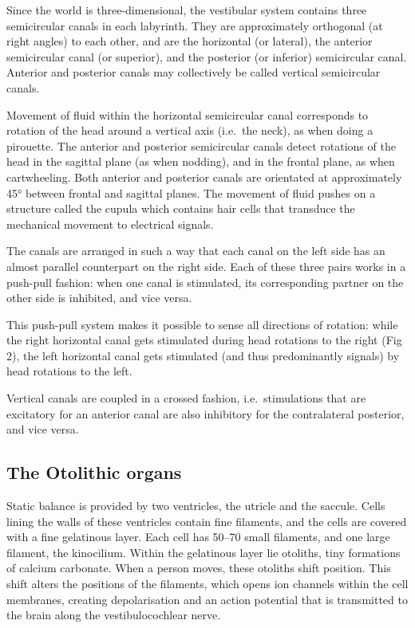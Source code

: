 Since the world is three-dimensional, the vestibular system contains three semicircular canals in each labyrinth. They are approximately orthogonal (at right angles) to each other, and are the horizontal (or lateral), the anterior semicircular canal (or superior), and the posterior (or inferior) semicircular canal. Anterior and posterior canals may collectively be called vertical semicircular canals.

Movement of fluid within the horizontal semicircular canal corresponds to rotation of the head around a vertical axis (i.e.~the neck), as when doing a pirouette.
The anterior and posterior semicircular canals detect rotations of the head in the sagittal plane (as when nodding), and in the frontal plane, as when cartwheeling. Both anterior and posterior canals are orientated at approximately 45° between frontal and sagittal planes.
The movement of fluid pushes on a structure called the cupula which contains hair cells that transduce the mechanical movement to electrical signals.

The canals are arranged in such a way that each canal on the left side has an almost parallel counterpart on the right side. Each of these three pairs works in a push-pull fashion: when one canal is stimulated, its corresponding partner on the other side is inhibited, and vice versa.

This push-pull system makes it possible to sense all directions of rotation: while the right horizontal canal gets stimulated during head rotations to the right (Fig 2), the left horizontal canal gets stimulated (and thus predominantly signals) by head rotations to the left.

Vertical canals are coupled in a crossed fashion, i.e.~stimulations that are excitatory for an anterior canal are also inhibitory for the contralateral posterior, and vice versa.

\hypertarget{the-otolithic-organs}{%
\subsection{The Otolithic organs}\label{the-otolithic-organs}}

Static balance is provided by two ventricles, the utricle and the saccule. Cells lining the walls of these ventricles contain fine filaments, and the cells are covered with a fine gelatinous layer. Each cell has 50--70 small filaments, and one large filament, the kinocilium. Within the gelatinous layer lie otoliths, tiny formations of calcium carbonate. When a person moves, these otoliths shift position. This shift alters the positions of the filaments, which opens ion channels within the cell membranes, creating depolarisation and an action potential that is transmitted to the brain along the vestibulocochlear nerve.

